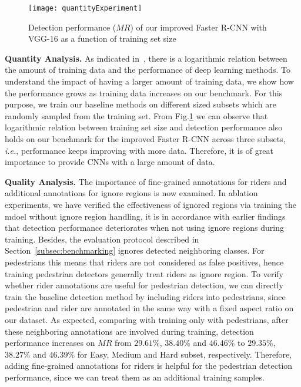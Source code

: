 \documentclass[journal]{IEEEtran}
\def\ie{{\em i.e.}}
\begin{document}
\begin{figure}[b]
\centering
\texttt{[image: quantityExperiment]}
\caption{Detection performance ($MR$) of our improved Faster R-CNN with VGG-16 as a function of training set size}
\label{fig:quantity}
\end{figure} 

{\flushleft \textbf{Quantity Analysis. }}
As indicated in~\cite{DBLP:conf/iccv/SunSSG17}, there is a logarithmic relation between the amount of training data and the performance of deep learning methods. To understand the impact of having a larger amount of training data, we show how the performance grows as training data increases on our benchmark. For this purpose, we train our baseline methods on different sized subsets which are randomly sampled from the training set. From Fig.\ref{fig:quantity} we can observe that logarithmic relation between training set size and detection performance also holds on our benchmark for the improved Faster R-CNN across three subsets, \ie, performance keeps improving with more data. Therefore, it is of great importance to provide CNNs with a large amount of data.

{\flushleft \textbf{Quality Analysis. }}
The importance of fine-grained annotations for riders and additional annotations for ignore regions is now examined. In ablation experiments, we have verified the effectiveness of ignored regions via training the mdoel without ignore region handling, it is in accordance with earlier findings~\cite{DBLP:conf/cvpr/ZhangBS17} that detection performance deteriorates when not using ignore regions during training. Besides, the evaluation protocol described in Section~\ref{subsec:benchmarking} ignores detected neighboring classes. For pedestrians this means that riders are not considered as false positives, hence training pedestrian detectors generally treat riders as ignore region. To verify whether rider annotations are useful for pedestrian detection, we can directly train the baseline detection method by including riders into pedestrians, since pedestrian and rider are annotated in the same way with a fixed aspect ratio on our dataset. As expected, comparing with training only with pedestrians, after these neighboring annotations are involved during training, detection performance increases on $MR$ from $29.61\%$, $38.40\%$ and $46.46\%$ to $29.35\%$, $38.27\%$ and $46.39\%$ for Easy, Medium and Hard subset, respectively. Therefore, adding fine-grained annotations for riders is helpful for the pedestrian detection performance, since we can treat them as an additional training samples.
\end{document}
